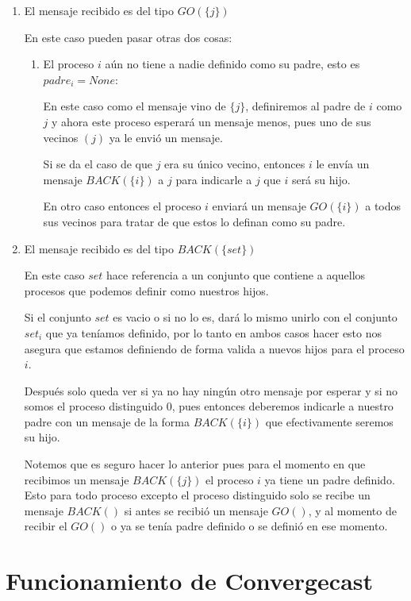 \begin{enumerate}
	\item El mensaje recibido es del tipo \(GO(\{j\})\)
	
	En este caso pueden pasar otras dos cosas: 
	
	\begin{enumerate}
		\item El proceso \(i\) aún no tiene a nadie definido como su padre, esto es \(padre_i = None\): 
		
		En este caso como el mensaje vino de \(\{j\}\), definiremos al padre de \(i\) como \(j\) y ahora este proceso esperará un mensaje menos, pues uno de sus vecinos \((j)\) ya le envió un mensaje.
		
		Si se da el caso de que \(j\) era su único vecino, entonces \(i\) le envía un mensaje \(BACK(\{i\})\) a \(j\) para indicarle a \(j\) que \(i\) será su hijo.
		
		En otro caso entonces el proceso \(i\) enviará un mensaje \(GO(\{i\})\) a todos sus vecinos para tratar de que estos lo definan como su padre. 
	\end{enumerate}
	
	\item El mensaje recibido es del tipo \(BACK(\{set\})\)
	
	En este caso \(set\) hace referencia a un conjunto que contiene a aquellos procesos que podemos definir como nuestros hijos.
	
	Si el conjunto \(set\) es vacio o si no lo es, dará lo mismo unirlo con el conjunto \(set_i\) que ya teníamos definido, por lo tanto en ambos casos hacer esto nos asegura que estamos definiendo de forma valida a nuevos hijos para el proceso \(i\).
	
	Después solo queda ver si ya no hay ningún otro mensaje por esperar y si no somos el proceso distinguido \(0\), pues entonces deberemos indicarle a nuestro padre con un mensaje de la forma \(BACK(\{i\})\) que efectivamente seremos su hijo.
	
	Notemos que es seguro hacer lo anterior pues para el momento en que recibimos un mensaje \(BACK(\{j\})\) el proceso \(i\) ya tiene un padre definido. Esto para todo proceso excepto el proceso distinguido solo se recibe un mensaje \(BACK()\) si antes se recibió un mensaje \(GO()\), y al momento de recibir el \(GO()\) o ya se tenía padre definido o se definió en ese momento.
\end{enumerate}


\section{Funcionamiento de Convergecast}

